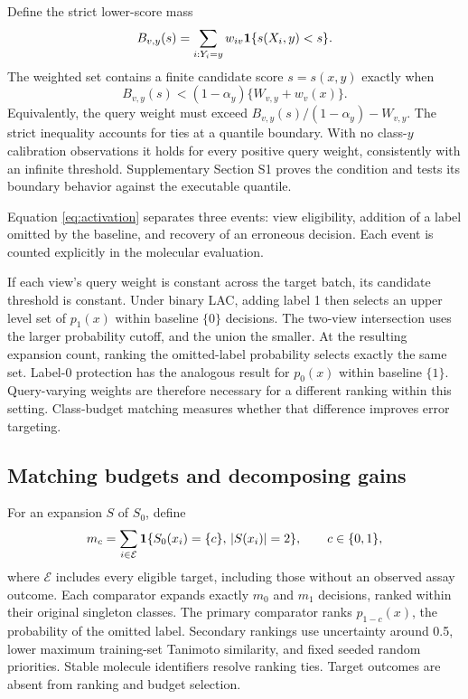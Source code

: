 Define the strict lower-score mass
\begin{equation}
 B_{v,y}(s)=\sum_{i:Y_i=y}w_{iv}\mathbf{1}\{s(X_i,y)<s\}.
\end{equation}
The weighted set contains a finite candidate score $s=s(x,y)$ exactly when
\begin{equation}
 B_{v,y}(s)<(1-\alpha_y)\{W_{v,y}+w_v(x)\}. \label{eq:activation}
\end{equation}
Equivalently, the query weight must exceed $B_{v,y}(s)/(1-\alpha_y)-W_{v,y}$. The strict inequality accounts for ties at a quantile boundary. With no class-$y$ calibration observations it holds for every positive query weight, consistently with an infinite threshold. Supplementary Section S1 proves the condition and tests its boundary behavior against the executable quantile.

Equation \ref{eq:activation} separates three events: view eligibility, addition of a label omitted by the baseline, and recovery of an erroneous decision. Each event is counted explicitly in the molecular evaluation.

If each view's query weight is constant across the target batch, its candidate threshold is constant. Under binary LAC, adding label 1 then selects an upper level set of $p_1(x)$ within baseline $\{0\}$ decisions. The two-view intersection uses the larger probability cutoff, and the union the smaller. At the resulting expansion count, ranking the omitted-label probability selects exactly the same set. Label-0 protection has the analogous result for $p_0(x)$ within baseline $\{1\}$. Query-varying weights are therefore necessary for a different ranking within this setting. Class-budget matching measures whether that difference improves error targeting.

\subsection{Matching budgets and decomposing gains}
For an expansion $S$ of $S_0$, define
\begin{equation}
 m_c=\sum_{i\in\mathcal E}\mathbf{1}\{S_0(x_i)=\{c\},\,|S(x_i)|=2\},\qquad c\in\{0,1\},
\end{equation}
where $\mathcal E$ includes every eligible target, including those without an observed assay outcome. Each comparator expands exactly $m_0$ and $m_1$ decisions, ranked within their original singleton classes. The primary comparator ranks $p_{1-c}(x)$, the probability of the omitted label. Secondary rankings use uncertainty around 0.5, lower maximum training-set Tanimoto similarity, and fixed seeded random priorities. Stable molecule identifiers resolve ranking ties. Target outcomes are absent from ranking and budget selection.

